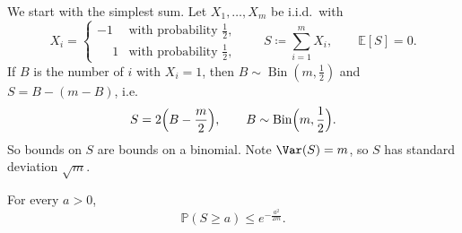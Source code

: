 We start with the simplest sum. Let \(X_{1}, \ldots, X_{m}\) be i.i.d.\ with
\[
    X_{i} = \begin{cases}
        -1 & \text{with probability } \frac{1}{2}, \\
        \phantom{-}1 & \text{with probability } \frac{1}{2},
    \end{cases}
    \qquad
    S \coloneqq \sum_{i=1}^{m} X_{i}, \qquad \mathbb{E}[S] = 0 .
\]
If \(B\) is the number of \(i\) with \(X_{i} = 1\), then \(B \sim \operatorname{Bin}(m, \frac{1}{2})\) and \(S = B - (m - B)\), i.e.
\begin{equation}\label{eq:signs-binomial}
    S = 2 \Bigl( B - \frac{m}{2} \Bigr), \qquad B \sim \operatorname{Bin}\Bigl( m, \frac{1}{2} \Bigr) .
\end{equation}
So bounds on \(S\) are bounds on a binomial. Note \(\Var(S) = m\), so \(S\) has standard deviation \(\sqrt{m}\).

\begin{theorem}\label{thm:chernoff-signs}
    For every \(a > 0\),
    \[
        \mathbb{P}(S \ge a) \le e^{-\frac{a^{2}}{2m}} .
    \]
\end{theorem}

